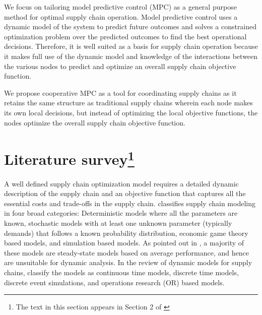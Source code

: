 We focus  on tailoring model predictive control (MPC) as a general
purpose method for optimal supply chain operation. 
Model predictive control uses a dynamic model of the system
to predict future outcomes and solves a constrained optimization
problem over the predicted outcomes to find the best operational
decisions. Therefore, it is well suited as a basis for supply chain
operation because it makes full use of the dynamic model and knowledge
of the interactions between the various nodes to predict and optimize
an overall supply chain objective function.

We propose cooperative MPC as a tool for coordinating supply chains as
it retains 
the same structure as traditional supply chains wherein each node
makes its own local decisions, but instead of optimizing the local
objective functions, the nodes optimize the overall supply chain
objective function.




\section{Literature survey\footnote{The text in this section appears in Section 2 of
\citet{subramanian:rawlings:maravelias:2012}}}
\label{sec:sc:litreview}
A well defined supply chain optimization model requires a detailed
dynamic description of the supply chain and an objective function that
captures all the essential costs and trade-offs in the supply chain.
\citet{beamon:1998} classifies supply chain modeling 
in four broad categories: Deterministic models where all the
parameters are known, stochastic models with at least one unknown
parameter (typically demands) that follows a known probability
distribution, economic game theory based models, and simulation based
models. As pointed out in
\citep{sarimevis:patrinos:tarantilis:kiranoudis:2008}, a majority of
these models are steady-state models based on average performance, and
hence are unsuitable for dynamic analysis. In the review of dynamic
models for supply chains, 
\citet{riddalls:bennett:tipi:2000} classify the models as continuous
time models, discrete time models, discrete event simulations, and
operations research (OR) based models.  

